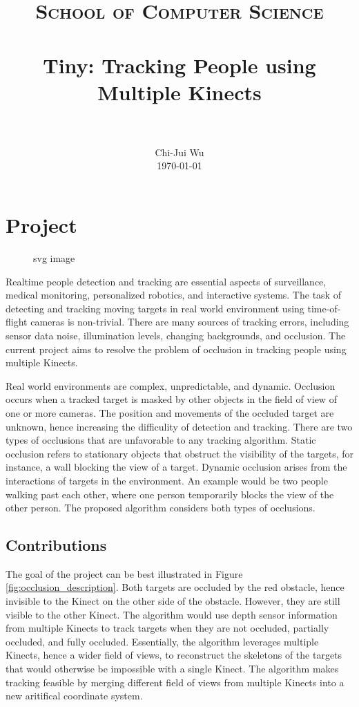\documentclass[paper=a4, fontsize=11pt]{scrartcl}
\title{
		\vspace{-3ex}
		\usefont{OT1}{bch}{b}{n}
		\normalfont \normalsize \textsc{School of Computer Science} \\ [25pt]
		\horrule{0.5pt} \\[0.4cm]
		\huge Tiny: Tracking People using Multiple Kinects \\
		\horrule{2pt} \\[0.5cm]
		\vspace{-2ex}
}
\author{
		\normalfont 								\normalsize
        Chi-Jui Wu\\[-3pt]		\normalsize
        \today
}
\date{}
\numberwithin{equation}{section}		%
\numberwithin{figure}{section}			%
\numberwithin{table}{section}				%
\begin{document}
\maketitle

\section{Project}

\begin{figure}[htbp]
  \centering
  
  \caption{svg image}
\end{figure}

Realtime people detection and tracking are essential aspects of surveillance, medical monitoring, personalized robotics, and interactive systems. The task of detecting and tracking moving targets in real world environment using time-of-flight cameras is non-trivial. There are many sources of tracking errors, including sensor data noise, illumination levels, changing backgrounds, and occlusion. The current project aims to resolve the problem of occlusion in tracking people using multiple Kinects.

Real world environments are complex, unpredictable, and dynamic. Occlusion occurs when a tracked target is masked by other objects in the field of view of one or more cameras. The position and movements of the occluded target are unknown, hence increasing the difficulity of detection and tracking. There are two types of occlusions that are unfavorable to any tracking algorithm. Static occlusion refers to stationary objects that obstruct the visibility of the targets, for instance, a wall blocking the view of a target. Dynamic occlusion arises from the interactions of targets in the environment. An example would be two people walking past each other, where one person temporarily blocks the view of the other person. The proposed algorithm considers both types of occlusions.

\subsection{Contributions}

The goal of the project can be best illustrated in Figure \ref{fig:occlusion_description}. Both targets are occluded by the red obstacle, hence invisible to the Kinect on the other side of the obstacle. However, they are still visible to the other Kinect. The algorithm would use depth sensor information from multiple Kinects to track targets when they are not occluded, partially occluded, and fully occluded. Essentially, the algorithm leverages multiple Kinects, hence a wider field of views, to reconstruct the skeletons of the targets that would otherwise be impossible with a single Kinect. The algorithm makes tracking feasible by merging different field of views from multiple Kinects into a new aritifical coordinate system.
\end{document}
